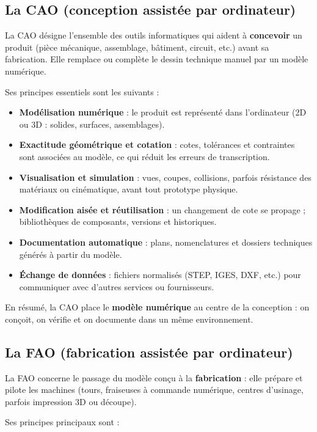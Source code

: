 \documentclass[12pt,a4paper]{article}
\begin{document}
\subsection{La CAO (conception assistée par ordinateur)}

La CAO désigne l'ensemble des outils informatiques qui aident à \textbf{concevoir} un produit (pièce mécanique, assemblage, bâtiment, circuit, etc.) avant sa fabrication. Elle remplace ou complète le dessin technique manuel par un modèle numérique.

Ses principes essentiels sont les suivants :

\begin{itemize}
  \item \textbf{Modélisation numérique} : le produit est représenté dans l'ordinateur (2D ou 3D : solides, surfaces, assemblages).
  \item \textbf{Exactitude géométrique et cotation} : cotes, tolérances et contraintes sont associées au modèle, ce qui réduit les erreurs de transcription.
  \item \textbf{Visualisation et simulation} : vues, coupes, collisions, parfois résistance des matériaux ou cinématique, avant tout prototype physique.
  \item \textbf{Modification aisée et réutilisation} : un changement de cote se propage ; bibliothèques de composants, versions et historiques.
  \item \textbf{Documentation automatique} : plans, nomenclatures et dossiers techniques générés à partir du modèle.
  \item \textbf{Échange de données} : fichiers normalisés (STEP, IGES, DXF, etc.) pour communiquer avec d'autres services ou fournisseurs.
\end{itemize}

En résumé, la CAO place le \textbf{modèle numérique} au centre de la conception : on conçoit, on vérifie et on documente dans un même environnement.

\subsection{La FAO (fabrication assistée par ordinateur)}

La FAO concerne le passage du modèle conçu à la \textbf{fabrication} : elle prépare et pilote les machines (tours, fraiseuses à commande numérique, centres d'usinage, parfois impression 3D ou découpe).

Ses principes principaux sont :
\end{document}

